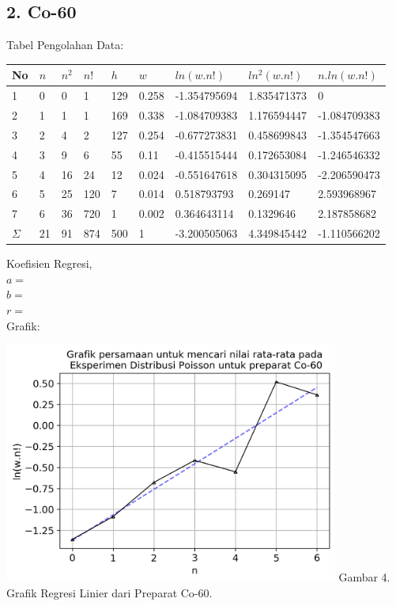 \documentclass{article}
\begin{document}
			\subsection*{2. Co-60}
			Tabel Pengolahan Data: 
			\begin{longtable}{@{}lllllllll@{}}
				\toprule
				No  & $n$  & $n^{2}$ & $n!$   & $h$   & $w$     & $ln(w.n!)$     & $ln^{2}(w.n!)$ & $n.ln(w.n!)$   \\ \midrule
				\endfirsthead
				\endhead
				\bottomrule
				\endfoot
				\endlastfoot
				1   & 0  & 0                    & 1   & 129 & 0.258 & -1.354795694 & 1.835471373                 & 0            \\
				2   & 1  & 1                    & 1   & 169 & 0.338 & -1.084709383 & 1.176594447                 & -1.084709383 \\
				3   & 2  & 4                    & 2   & 127 & 0.254 & -0.677273831 & 0.458699843                 & -1.354547663 \\
				4   & 3  & 9                    & 6   & 55  & 0.11  & -0.415515444 & 0.172653084                 & -1.246546332 \\
				5   & 4  & 16                   & 24  & 12  & 0.024 & -0.551647618 & 0.304315095                 & -2.206590473 \\
				6   & 5  & 25                   & 120 & 7   & 0.014 & 0.518793793  & 0.269147                    & 2.593968967  \\
				7   & 6  & 36                   & 720 & 1   & 0.002 & 0.364643114  & 0.1329646                   & 2.187858682  \\* \midrule
				$\Sigma$ & 21 & 91                   & 874 & 500 & 1     & -3.200505063 & 4.349845442                 & -1.110566202 \\* \bottomrule
			\end{longtable}
			\hspace{-0.6cm}Koefisien Regresi, \\
			$a = $ \\
			$b = $ \\
			$r = $ \\
			Grafik: 
			\begin{center}
				\includegraphics[width=110mm]{Data/Co-60-Graph.png}
				Gambar 4. Grafik Regresi Linier dari Preparat Co-60.
			\end{center}
\end{document}
